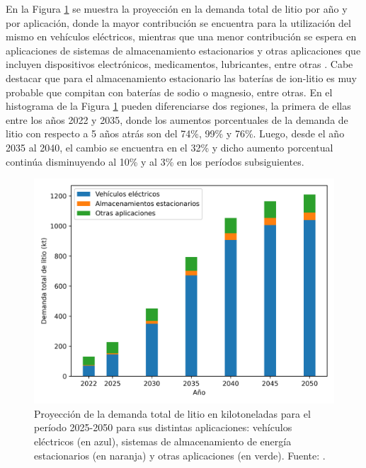 En la Figura \ref{fig:iea-Li} se muestra la proyección en la demanda total de 
litio por año y por aplicación, donde la mayor contribución se encuentra para la 
utilización del mismo en vehículos eléctricos, mientras que una menor contribución 
se espera en aplicaciones de sistemas de almacenamiento estacionarios y otras 
aplicaciones que incluyen dispositivos electrónicos, medicamentos, lubricantes, 
entre otras \cite{IEA}. 
Cabe destacar que para el almacenamiento estacionario 
las baterías de ion-litio es muy probable que compitan con baterías de sodio o magnesio, entre 
otras. En el histograma de la Figura \ref{fig:iea-Li} pueden diferenciarse dos 
regiones, la primera de ellas entre los años 2022 y 2035, donde los aumentos
porcentuales de la demanda de litio con respecto a 5 años atrás son del 74\%, 
99\% y 76\%. Luego, desde el año 2035 al 2040, el cambio se encuentra en el 32\% y
dicho aumento porcentual continúa disminuyendo al 10\% y al 3\% en los períodos 
subsiguientes.
\begin{figure}[h!]
    \centering
    \includegraphics[width=.8\textwidth]{Introduccion/energia/iea-Li.png}
    \caption{Proyección de la demanda total de litio en kilotoneladas para el 
    período 2025-2050 para sus distintas aplicaciones: vehículos eléctricos (en 
    azul), sistemas de almacenamiento de energía estacionarios (en naranja) y
    otras aplicaciones (en verde). Fuente: \cite{IEA}.}
    \label{fig:iea-Li}
\end{figure}
